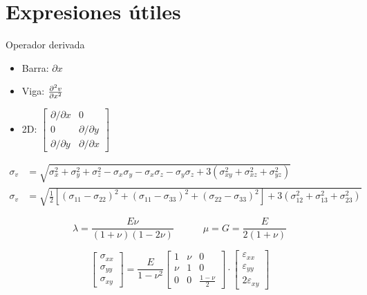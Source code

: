 \section*{Expresiones útiles}
Operador derivada
\begin{itemize}
	\item Barra: $\partial x$
	\item Viga: $\frac{\partial^2 v}{\partial x ^2}$
	\item 2D: $\begin{bmatrix}
	\partial/\partial x & 0\\
	0 & \partial/\partial y \\
	\partial/\partial y & \partial/\partial x
	\end{bmatrix}$

\end{itemize}

\begin{align}
\sigma_{v}&=\sqrt{\sigma_{x}^2+\sigma_{y}^2+\sigma_{z}^2 - \sigma_x \sigma_y-\sigma_x\sigma_z -\sigma_y \sigma_z +3(\sigma_{xy}^2+\sigma_{xz}^2 +\sigma_{yz}^2)} \\
\sigma_{v}&=\sqrt{\tfrac{1}{2}\left[  (\sigma_{11}-\sigma_{22})^2+(\sigma_{11}-\sigma_{33})^2+(\sigma_{22}-\sigma_{33})^2\right] +3(\sigma_{12}^2+\sigma_{13}^2 +\sigma_{23}^2)}
\end{align}

\begin{equation}
\lambda = \frac{E \nu}{(1+\nu)(1-2\nu)} \qquad\quad \mu=G=\frac{E}{2(1+\nu)}
\end{equation}

\begin{equation}
\begin{bmatrix}
\sigma_{xx} \\
\sigma_{yy} \\
\sigma_{xy}
\end{bmatrix}
={\frac{E}{1-\nu^2}} 
\begin{bmatrix}
1 & \nu & 0 \\
\nu & 1 &0 \\
0 & 0 & \frac{1-\nu}{2}
\end{bmatrix}
\cdot
\begin{bmatrix}
\varepsilon_{xx} \\
\varepsilon_{yy} \\
2\varepsilon_{xy}
\end{bmatrix}
\end{equation}

